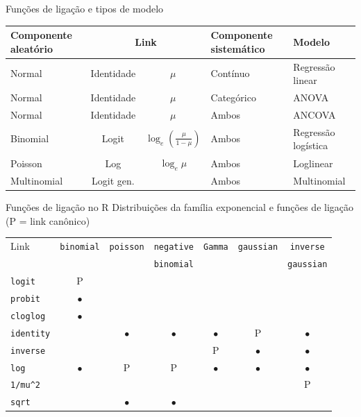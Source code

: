 \documentclass[10pt]{beamer}\usepackage[]{graphicx}\usepackage[]{color}
\theoremstyle{definition}
\begin{document}
\begin{frame}[fragile]{Funções de ligação e tipos de modelo}
  \begin{table}[!h]
    \centering
    \begin{tabular}{p{1.5cm}ccp{2cm}p{1.5cm}}
      \hline
      Componente aleatório & \multicolumn{2}{c}{Link}
      & Componente sistemático & Modelo \\
      \hline
      Normal & Identidade & $\mu$ & Contínuo & Regressão linear \\
      Normal & Identidade & $\mu$ & Categórico & ANOVA \\
      Normal & Identidade & $\mu$ & Ambos & ANCOVA \\
      Binomial & Logit & $\log_{e}\left( \frac{\mu}{1-\mu} \right)$
                               & Ambos & Regressão logística \\
      Poisson & Log & $\log_{e} \mu$ & Ambos & Loglinear \\
      Multinomial & Logit gen. & & Ambos & Multinomial \\
      \hline
    \end{tabular}
  \end{table}
\end{frame}

\begin{frame}[fragile]{Funções de ligação no R}
Distribuições da família exponencial e funções de ligação (P = link
canônico)
\begin{center}
\begin{table}[h!]
\renewcommand{\baselinestretch}{1}
\small\footnotesize\scriptsize
\begin{tabular}{lcccccc}
\hline
Link & \texttt{binomial} & \texttt{poisson} & \texttt{negative} &
\texttt{Gamma} & \texttt{gaussian} & \texttt{inverse}\\
    &       &    & \texttt{binomial} &  &  & \texttt{gaussian} \\
\hline
\texttt{logit} & P & & & & & \\
\texttt{probit} & $\bullet$ & & & & &  \\
\texttt{cloglog} & $\bullet$ & & & & &  \\
\texttt{identity} &  & $\bullet$ & $\bullet$ & $\bullet$ & P & $\bullet$  \\
\texttt{inverse} &  & & & P & $\bullet$ & $\bullet$  \\
\texttt{log} & $\bullet$  & P & P & $\bullet$ & $\bullet$ & $\bullet$  \\
\verb|1/mu^2| & & & & & & P  \\
\texttt{sqrt} & & $\bullet$ & $\bullet$ & & &  \\
\hline
\end{tabular}
\end{table}
\end{center}
\end{frame}
\end{document}
